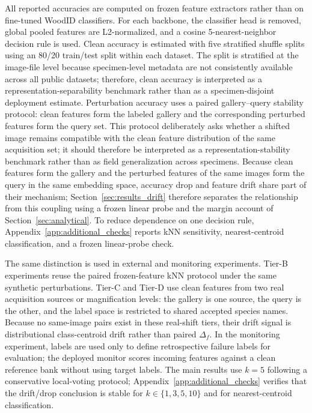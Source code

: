 \documentclass[a4paper,fleqn]{els-cas-templates/cas-sc}
\begin{document}
All reported accuracies are computed on frozen feature extractors rather than on fine-tuned WoodID classifiers. For each backbone, the classifier head is removed, global pooled features are L2-normalized, and a cosine 5-nearest-neighbor decision rule is used. Clean accuracy is estimated with five stratified shuffle splits using an 80/20 train/test split within each dataset. The split is stratified at the image-file level because specimen-level metadata are not consistently available across all public datasets; therefore, clean accuracy is interpreted as a representation-separability benchmark rather than as a specimen-disjoint deployment estimate. Perturbation accuracy uses a paired gallery--query stability protocol: clean features form the labeled gallery and the corresponding perturbed features form the query set. This protocol deliberately asks whether a shifted image remains compatible with the clean feature distribution of the same acquisition set; it should therefore be interpreted as a representation-stability benchmark rather than as field generalization across specimens. Because clean features form the gallery and the perturbed features of the same images form the query in the same embedding space, accuracy drop and feature drift share part of their mechanism; Section~\ref{sec:results_drift} therefore separates the relationship from this coupling using a frozen linear probe and the margin account of Section~\ref{sec:analytical}. To reduce dependence on one decision rule, Appendix~\ref{app:additional_checks} reports kNN sensitivity, nearest-centroid classification, and a frozen linear-probe check.

The same distinction is used in external and monitoring experiments. Tier-B
experiments reuse the paired frozen-feature kNN protocol under the same synthetic
perturbations. Tier-C and Tier-D use clean features from two real acquisition
sources or magnification levels: the gallery is one source, the query is the
other, and the label space is restricted to shared accepted species names.
Because no same-image pairs exist in these real-shift tiers, their drift signal
is distributional class-centroid drift rather than paired $\Delta_f$. In the
monitoring experiment, labels are used only to define retrospective failure
labels for evaluation; the deployed monitor scores incoming features against a
clean reference bank without using target labels. The main results use $k=5$
following a conservative local-voting protocol; Appendix~\ref{app:additional_checks}
verifies that the drift/drop conclusion is stable for $k\in\{1,3,5,10\}$ and for
nearest-centroid classification.
\end{document}

